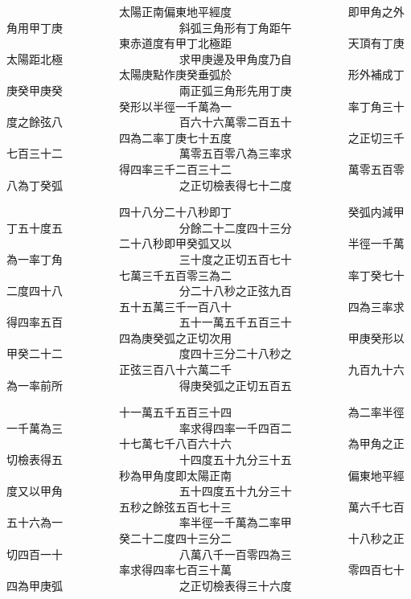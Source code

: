 \begin{正文}
　　　　　　　　　　太陽正南偏東地平經度
　　　　　　　　　　即甲角之外角用甲丁庚
　　　　　　　　　　斜弧三角形有丁角距午
　　　　　　　　　　東赤道度有甲丁北極距
　　　　　　　　　　天頂有丁庚太陽距北極
　　　　　　　　　　求甲庚邊及甲角度乃自
　　　　　　　　　　太陽庚點作庚癸垂弧於
　　　　　　　　　　形外補成丁庚癸甲庚癸
　　　　　　　　　　兩正弧三角形先用丁庚
　　　　　　　　　　癸形以半徑一千萬為一
　　　　　　　　　　率丁角三十度之餘弦八
　　　　　　　　　　百六十六萬零二百五十
　　　　　　　　　　四為二率丁庚七十五度
　　　　　　　　　　之正切三千七百三十二
　　　　　　　　　　萬零五百零八為三率求
　　　　　　　　　　得四率三千二百三十二
　　　　　　　　　　萬零五百零八為丁癸弧
　　　　　　　　　　之正切檢表得七十二度
\par
\end{正文}\clearpage
{}
\begin{正文}
　　　　　　　　　　四十八分二十八秒即丁
　　　　　　　　　　癸弧内減甲丁五十度五
　　　　　　　　　　分餘二十二度四十三分
　　　　　　　　　　二十八秒即甲癸弧又以
　　　　　　　　　　半徑一千萬為一率丁角
　　　　　　　　　　三十度之正切五百七十
　　　　　　　　　　七萬三千五百零三為二
　　　　　　　　　　率丁癸七十二度四十八
　　　　　　　　　　分二十八秒之正弦九百
　　　　　　　　　　五十五萬三千一百八十
　　　　　　　　　　四為三率求得四率五百
　　　　　　　　　　五十一萬五千五百三十
　　　　　　　　　　四為庚癸弧之正切次用
　　　　　　　　　　甲庚癸形以甲癸二十二
　　　　　　　　　　度四十三分二十八秒之
　　　　　　　　　　正弦三百八十六萬二千
　　　　　　　　　　九百九十六為一率前所
　　　　　　　　　　得庚癸弧之正切五百五
\par
\end{正文}\clearpage
{}
\begin{正文}
　　　　　　　　　　十一萬五千五百三十四
　　　　　　　　　　為二率半徑一千萬為三
　　　　　　　　　　率求得四率一千四百二
　　　　　　　　　　十七萬七千八百六十六
　　　　　　　　　　為甲角之正切檢表得五
　　　　　　　　　　十四度五十九分三十五
　　　　　　　　　　秒為甲角度即太陽正南
　　　　　　　　　　偏東地平經度又以甲角
　　　　　　　　　　五十四度五十九分三十
　　　　　　　　　　五秒之餘弦五百七十三
　　　　　　　　　　萬六千七百五十六為一
　　　　　　　　　　率半徑一千萬為二率甲
　　　　　　　　　　癸二十二度四十三分二
　　　　　　　　　　十八秒之正切四百一十
　　　　　　　　　　八萬八千一百零四為三
　　　　　　　　　　率求得四率七百三十萬
　　　　　　　　　　零四百七十四為甲庚弧
　　　　　　　　　　之正切檢表得三十六度
\par
\end{正文}\clearpage
